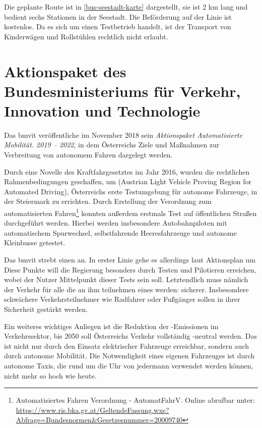 Die geplante Route ist in \ref{bus-seestadt-karte} dargestellt, sie ist 2 \si{\kilo\metre} lang und bedient sechs Stationen in der Seestadt. Die Beförderung auf der Linie ist kostenlos. Da es sich um einen Testbetrieb handelt, ist der Transport von Kinderwägen und Rollstühlen rechtlich nicht erlaubt.


\section{Aktionspaket des Bundesministeriums für Verkehr, Innovation und Technologie}

Das \ac{bmvit} veröffentliche im November 2018 sein \textit{Aktionspaket Automatisierte Mobilität. 2019 -- 2022}, in dem Österreichs Ziele und Maßnahmen zur Verbreitung von autonomem Fahren dargelegt werden.

Durch eine Novelle des Kraftfahrgesetztes im Jahr 2016, wurden die rechtlichen Rahmenbedingungen geschaffen, um  (Austrian Light Vehicle Proving Region for Automated Driving), Österreichs erste Testumgebung für autonome Fahrzeuge, in der Steiermark zu errichten. Durch Erstellung der Verordnung zum automatisierten Fahren\footnote{Automatisiertes Fahren Verordnung - AutomatFahrV. Online abrufbar unter: \url{https://www.ris.bka.gv.at/GeltendeFassung.wxe?Abfrage=Bundesnormen&Gesetzesnummer=20009740}} konnten außerdem erstmals Test auf öffentlichen Straßen durchgeführt werden. Hierbei werden insbesondere Autobahnpiloten mit automatischem Spurwechsel, selbstfahrende Heeresfahrzeuge und autonome Kleinbusse getestet.

Das \ac{bmvit} strebt einen  an. In erster Linie gehe es allerdings laut Aktionsplan um  Diese Punkte will die Regierung besonders durch Testen und Pilotieren erreichen, wobei der Nutzer Mittelpunkt dieser Tests sein soll. Letztendlich muss nämlich der Verkehr für alle die an ihm teilnehmen eines werden: sicherer. Insbesondere schwächere Verkehrsteilnehmer wie Radfahrer oder Fußgänger sollen in ihrer Sicherheit gestärkt werden.

Ein weiteres wichtiges Anliegen ist die Reduktion der -Emissionen im Verkehrssektor, bis 2050 soll Österreichs Verkehr vollständig -neutral werden. Das ist nicht nur durch den Einsatz elektrischer Fahrzeuge erreichbar, sondern auch durch autonome Mobilität. Die Notwendigkeit eines eigenen Fahrzeuges ist durch autonome Taxis, die rund um die Uhr von jedermann verwendet werden können, nicht mehr so hoch wie heute.
